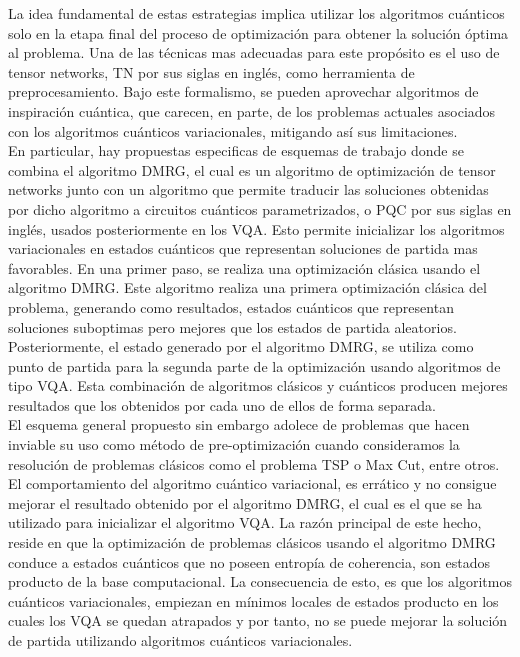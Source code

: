 \newpage

La idea fundamental de estas estrategias implica utilizar los algoritmos cuánticos solo en la etapa final del proceso de optimización para obtener la solución óptima al problema. Una de las técnicas mas adecuadas para este propósito es el uso de tensor networks, TN por sus siglas en inglés, como herramienta de preprocesamiento. Bajo este formalismo, se pueden aprovechar algoritmos de inspiración cuántica, que carecen, en parte, de los problemas actuales asociados con los algoritmos cuánticos variacionales, mitigando así sus limitaciones. \\

En particular, hay propuestas especificas de esquemas de trabajo donde se combina el algoritmo DMRG, el cual es un algoritmo de optimización de tensor networks junto con un algoritmo que permite traducir las soluciones obtenidas por dicho algoritmo a circuitos cuánticos parametrizados, o \mbox{PQC} por sus siglas en inglés, usados posteriormente en los VQA. Esto permite inicializar los algoritmos variacionales en estados cuánticos que representan soluciones de partida mas favorables. En una primer paso, se realiza una optimización clásica usando el algoritmo DMRG. Este algoritmo realiza una primera optimización clásica del problema, generando como resultados, estados cuánticos que representan soluciones suboptimas pero mejores que los estados de partida aleatorios. Posteriormente, el estado generado por el algoritmo DMRG, se utiliza como punto de partida para la segunda parte de la optimización usando algoritmos de tipo VQA. Esta combinación de algoritmos clásicos y cuánticos producen mejores resultados que los obtenidos por cada uno de ellos de forma separada. \\

El esquema general propuesto sin embargo adolece de problemas que hacen inviable su uso como método de pre-optimización cuando consideramos la resolución de problemas clásicos como el problema TSP o Max Cut, entre otros. El comportamiento del algoritmo cuántico variacional, es errático y no consigue mejorar el resultado obtenido por el algoritmo DMRG, el cual es el que se ha utilizado para inicializar el algoritmo VQA. La razón principal de este hecho, reside en que la optimización de problemas clásicos usando el algoritmo DMRG conduce a estados cuánticos que no poseen entropía de coherencia, son estados producto de la base computacional. La consecuencia de esto, es que los algoritmos cuánticos variacionales, empiezan en mínimos locales de estados producto en los cuales los VQA se quedan atrapados y por tanto, no se puede mejorar la solución de partida utilizando algoritmos cuánticos variacionales. 

